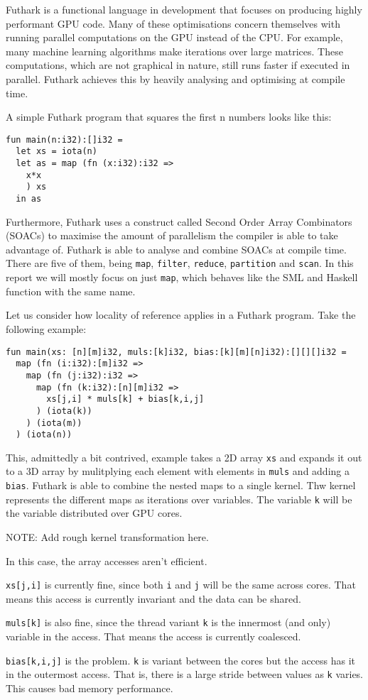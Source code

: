 \documentclass{article}
\begin{document}
Futhark is a functional language in development that focuses on producing highly performant GPU code. Many of these optimisations concern themselves with
running parallel computations on the GPU instead of the CPU\@. For example, many machine learning algorithms make iterations over large matrices. These
computations, which are not graphical in nature, still runs faster if executed in parallel. Futhark achieves this by heavily analysing and optimising at compile
time.

A simple Futhark program that squares the first n numbers looks like this:
\begin{verbatim}
fun main(n:i32):[]i32 =
  let xs = iota(n)
  let as = map (fn (x:i32):i32 =>
    x*x
    ) xs
  in as
\end{verbatim}

Furthermore, Futhark uses a construct called Second Order Array Combinators (SOACs) to maximise the amount of parallelism the compiler is able to take advantage
of.  Futhark is able to analyse and combine SOACs at compile time. There are five of them, being \verb`map`, \verb`filter`, \verb`reduce`, \verb`partition` and
\verb`scan`. In this report we will mostly focus on just \verb`map`, which behaves like the SML and Haskell function with the same name.

Let us consider how locality of reference applies in a Futhark program. Take the following example:
\begin{verbatim}
fun main(xs: [n][m]i32, muls:[k]i32, bias:[k][m][n]i32):[][][]i32 =
  map (fn (i:i32):[m]i32 =>
    map (fn (j:i32):i32 => 
      map (fn (k:i32):[n][m]i32 =>
        xs[j,i] * muls[k] + bias[k,i,j]
      ) (iota(k))
    ) (iota(m))
  ) (iota(n))
\end{verbatim}

This, admittedly a bit contrived, example takes a 2D array \verb`xs` and expands it out to a 3D array by mulitplying each element with elements in \verb`muls`
and adding a \verb`bias`.  Futhark is able to combine the nested maps to a single kernel. Thw kernel represents the different maps as iterations over variables.
The variable \verb`k` will be the variable distributed over GPU cores. 

NOTE: Add rough kernel transformation here.

In this case, the array accesses aren't efficient.
\begin{description}
\item \verb`xs[j,i]` is currently fine, since both \verb`i` and \verb`j` will be the same across cores. That means this access is currently invariant and the
data can be shared.
\item \verb`muls[k]` is also fine, since the thread variant \verb`k` is the innermost (and only) variable in the access. That means the access is currently
coalesced.
\item \verb`bias[k,i,j]` is the problem. \verb`k` is variant between the cores but the access has it in the outermost access. That is, there is a large stride
between values as \verb`k` varies. This causes bad memory performance.
\end{description}
\end{document}
